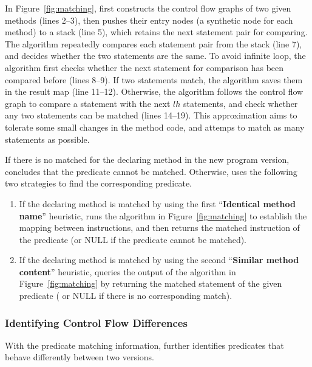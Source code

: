 In Figure~\ref{fig:matching}, \ourtool first constructs the control
flow graphs of two given methods (lines 2--3), then pushes their
entry nodes (a synthetic node for each method) to a stack (line 5), which retains
the next statement pair for comparing. The algorithm repeatedly
compares each statement pair from the stack (line 7), and
decides whether the two statements are the same. To avoid infinite
loop, the algorithm first checks whether the next statement for comparison
has been compared before (lines 8--9). If two statements match,
the algorithm saves them in the result map (line 11--12). Otherwise,
the algorithm follows the control flow graph to compare a statement with
the next $lh$ statements, and check whether any two statements can be
matched (lines 14--19). This approximation aims to tolerate some small
changes in the method code, and attemps to match as many statements as possible.


If there is no matched for the declaring method in the new program
version, \ourtool concludes that the predicate cannot be
matched. Otherwise, \ourtool uses the following two strategies
to find the corresponding predicate.

\begin{enumerate}
\item If the declaring method is matched by using the first
``\textbf{Identical method name}'' heuristic, \ourtool runs the algorithm
in Figure~\ref{fig:matching} to establish the mapping between
instructions, and then returns the matched instruction of the
predicate (or NULL if the predicate cannot be matched).
\item If the declaring method is matched by using the second
``\textbf{Similar method content}'' heuristic,  \ourtool
queries the output of the algorithm in Figure~\ref{fig:matching}
by returning the matched statement of the given predicate (
or NULL if there is no corresponding match).
\end{enumerate}




\subsubsection{Identifying Control Flow Differences}
\label{sec:identify_diff}

With the predicate matching information, \ourtool further
identifies predicates that behave differently
between two versions. 

